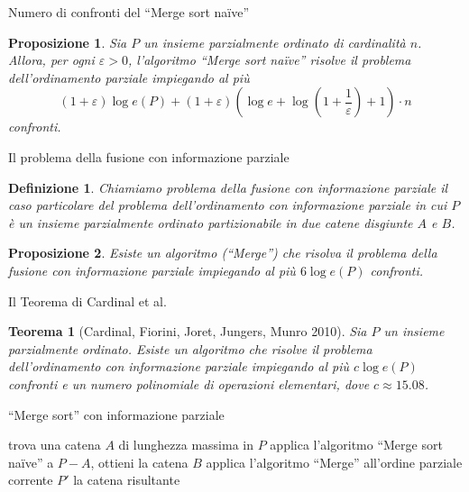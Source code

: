 \documentclass[10pt]{beamer}
\newtheorem{teorema}{Teorema}
\newtheorem{definizione}{Definizione}
\newtheorem{proposizione}{Proposizione}
\begin{document}
\begin{frame}
  {Numero di confronti del ``Merge sort na\"ive''}
  \begin{proposizione}
    Sia \(P\) un insieme parzialmente ordinato di cardinalità \(n\). Allora, 
    per ogni \(\varepsilon>0\), l'algoritmo ``Merge sort na\"ive'' risolve il 
    problema dell'ordinamento parziale impiegando al più 
\[(1+\varepsilon)\log{e(P)}+(1+\varepsilon)\left(\log{e}+\log{\left(1+\frac{1}{\varepsilon}\right)}+1\right)\cdot n\] 
    confronti.
  \end{proposizione}
\end{frame}

\begin{frame}
  {Il problema della fusione con informazione parziale}
  \begin{definizione}
    Chiamiamo \emph{problema della fusione con informazione parziale} il caso 
    particolare del problema dell'ordinamento con informazione parziale in cui 
    \(P\) è un insieme parzialmente ordinato partizionabile in due catene 
    disgiunte \(A\) e \(B\).
  \end{definizione}
  \vspace{5mm}
  \begin{proposizione}
    Esiste un algoritmo (``Merge'') che risolva il problema della fusione con informazione 
    parziale impiegando al più \(6\log{e(P)}\) confronti.
  \end{proposizione}
\end{frame}

\begin{frame}
  {Il Teorema di Cardinal et al.}
  \begin{teorema}[Cardinal, Fiorini, Joret, Jungers, Munro 2010]
    Sia \(P\) un insieme parzialmente ordinato. Esiste un algoritmo che risolve il problema dell'ordinamento con informazione parziale impiegando al pi\`u \(c\log{e(P)}\) confronti e un numero polinomiale di operazioni elementari, dove \(c\approx 15.08\).
  \end{teorema}
\end{frame}

\begin{frame}
  {``Merge sort'' con informazione parziale}
  \begin{algorithm}[H]
    \caption{``Merge sort'' con informazione parziale} 
    \begin{algorithmic}[1] 
      \STATE trova una catena \(A\) di lunghezza massima in \(P\) 
      \STATE applica l'algoritmo ``Merge sort na\"ive'' a \(P-A\), ottieni la catena \(B\) 
      \STATE applica l'algoritmo ``Merge'' all'ordine parziale corrente \(P'\) 
      \RETURN la catena risultante 
    \end{algorithmic}
  \end{algorithm}
\end{frame}
\end{document}
